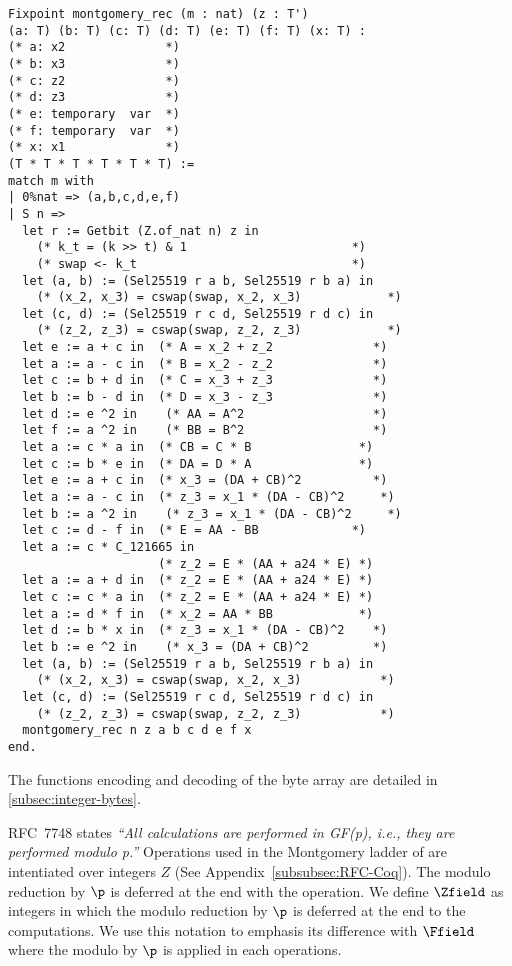 \begin{lstlisting}[language=Coq]
Fixpoint montgomery_rec (m : nat) (z : T')
(a: T) (b: T) (c: T) (d: T) (e: T) (f: T) (x: T) :
(* a: x2              *)
(* b: x3              *)
(* c: z2              *)
(* d: z3              *)
(* e: temporary  var  *)
(* f: temporary  var  *)
(* x: x1              *)
(T * T * T * T * T * T) :=
match m with
| 0%nat => (a,b,c,d,e,f)
| S n =>
  let r := Getbit (Z.of_nat n) z in
    (* k_t = (k >> t) & 1                       *)
    (* swap <- k_t                              *)
  let (a, b) := (Sel25519 r a b, Sel25519 r b a) in
    (* (x_2, x_3) = cswap(swap, x_2, x_3)            *)
  let (c, d) := (Sel25519 r c d, Sel25519 r d c) in
    (* (z_2, z_3) = cswap(swap, z_2, z_3)            *)
  let e := a + c in  (* A = x_2 + z_2              *)
  let a := a - c in  (* B = x_2 - z_2              *)
  let c := b + d in  (* C = x_3 + z_3              *)
  let b := b - d in  (* D = x_3 - z_3              *)
  let d := e ^2 in    (* AA = A^2                  *)
  let f := a ^2 in    (* BB = B^2                  *)
  let a := c * a in  (* CB = C * B               *)
  let c := b * e in  (* DA = D * A               *)
  let e := a + c in  (* x_3 = (DA + CB)^2          *)
  let a := a - c in  (* z_3 = x_1 * (DA - CB)^2     *)
  let b := a ^2 in    (* z_3 = x_1 * (DA - CB)^2     *)
  let c := d - f in  (* E = AA - BB             *)
  let a := c * C_121665 in
                     (* z_2 = E * (AA + a24 * E) *)
  let a := a + d in  (* z_2 = E * (AA + a24 * E) *)
  let c := c * a in  (* z_2 = E * (AA + a24 * E) *)
  let a := d * f in  (* x_2 = AA * BB            *)
  let d := b * x in  (* z_3 = x_1 * (DA - CB)^2    *)
  let b := e ^2 in    (* x_3 = (DA + CB)^2         *)
  let (a, b) := (Sel25519 r a b, Sel25519 r b a) in
    (* (x_2, x_3) = cswap(swap, x_2, x_3)           *)
  let (c, d) := (Sel25519 r c d, Sel25519 r d c) in
    (* (z_2, z_3) = cswap(swap, z_2, z_3)           *)
  montgomery_rec n z a b c d e f x
end.
\end{lstlisting}

The functions encoding and decoding of the byte array are detailed in
\ref{subsec:integer-bytes}.

RFC~7748 states \emph{``All calculations are performed in GF(p), i.e., they are performed modulo p.''}
Operations used in the Montgomery ladder of  are intentiated over
integers $Z$ (See Appendix~\ref{subsubsec:RFC-Coq}). The modulo reduction by $\p$
is deferred at the end with the  operation.
We define $\Zfield$ as integers in which the modulo reduction by $\p$ is
deferred at the end to the computations.
We use this notation to emphasis its difference with $\Ffield$ where the
modulo by $\p$ is applied in each operations.


